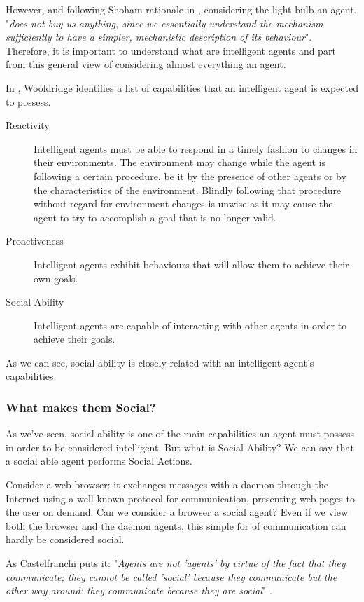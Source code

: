 However, and following Shoham rationale in \cite{shoham:agentorientedprogramming}, considering the light bulb an agent, "\textit{does not buy us anything, since we essentially understand the mechanism sufficiently to have a simpler, mechanistic description of its behaviour}".
Therefore, it is important to understand what are intelligent agents and part from this general view of considering almost everything an agent.

In \cite{wooldridge:multiagent-systems}, Wooldridge identifies a list of capabilities that an intelligent agent is expected to possess.

\begin{description}
	\item[Reactivity] Intelligent agents must be able to respond in a timely fashion to changes in their environments.
	The environment may change while the agent is following a certain procedure, be it by the presence of other agents or by the characteristics of the environment.
	Blindly following that procedure without regard for environment changes is unwise as it may cause the agent to try to accomplish a goal that is no longer valid.
	\item[Proactiveness] Intelligent agents exhibit behaviours that will allow them to achieve their own goals. 
	\item[Social Ability] Intelligent agents are capable of interacting with other agents in order to achieve their goals.
\end{description}

As we can see, social ability is closely related with an intelligent agent's capabilities.

\subsubsection{What makes them Social?}
As we've seen, social ability is one of the main capabilities an agent must possess in order to be considered intelligent.
But what is Social Ability?
We can say that a social able agent performs Social Actions.

Consider a web browser: it exchanges messages with a daemon through the Internet using a well-known protocol for communication, presenting web pages to the user on demand.
Can we consider a browser a social agent?
Even if we view both the browser and the daemon agents, this simple for of communication can hardly be considered social.

As Castelfranchi puts it: "\textit{Agents are not 'agents' by virtue of the fact that they communicate;
they cannot be called 'social' because they communicate but the other way around: they communicate because they are social}" \cite{castelfranchi:socialactions}.

